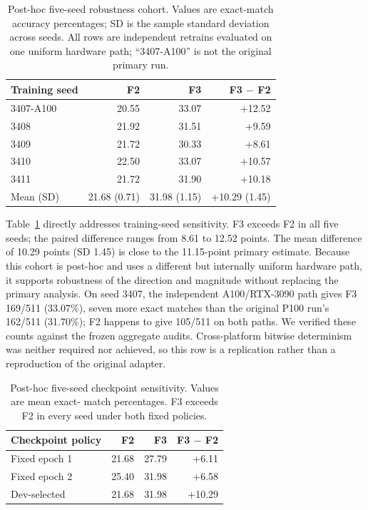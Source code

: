 \documentclass[11pt,a4paper]{article}
\begin{document}
\begin{table}[t]
\centering
\scriptsize
\setlength{\tabcolsep}{3pt}
\begin{tabular}{lrrr}
\toprule
Training seed & F2 & F3 & F3 $-$ F2 \\
\midrule
3407-A100 & 20.55 & 33.07 & +12.52 \\
3408 & 21.92 & 31.51 & +9.59 \\
3409 & 21.72 & 30.33 & +8.61 \\
3410 & 22.50 & 33.07 & +10.57 \\
3411 & 21.72 & 31.90 & +10.18 \\
\midrule
Mean (SD) & 21.68 (0.71) & 31.98 (1.15) & +10.29 (1.45) \\
\bottomrule
\end{tabular}
\caption{Post-hoc five-seed robustness cohort. Values are exact-match
accuracy percentages; SD is the sample standard deviation across seeds. All
rows are independent retrains evaluated on one uniform hardware path;
``3407-A100'' is not the original primary run.}
\label{tab:multiseed}
\end{table}

Table~\ref{tab:multiseed} directly addresses training-seed sensitivity.  F3
exceeds F2 in all five seeds; the paired difference ranges from 8.61 to 12.52
points.  The mean difference of 10.29 points (SD 1.45) is close to the
11.15-point primary estimate.  Because this cohort is post-hoc and uses a
different but internally uniform hardware path, it supports robustness of the
direction and magnitude without replacing the primary analysis.  On seed
3407, the independent A100/RTX-3090 path gives F3 169/511 (33.07\%), seven
more exact matches than the original P100 run's 162/511 (31.70\%); F2 happens
to give 105/511 on both paths.  We verified these counts against the frozen
aggregate audits.  Cross-platform bitwise determinism was neither required nor
achieved, so this row is a replication rather than a reproduction of the
original adapter.

\begin{table}[t]
\centering
\small
\begin{tabular}{lrrr}
\toprule
Checkpoint policy & F2 & F3 & F3 $-$ F2 \\
\midrule
Fixed epoch 1 & 21.68 & 27.79 & +6.11 \\
Fixed epoch 2 & 25.40 & 31.98 & +6.58 \\
Dev-selected & 21.68 & 31.98 & +10.29 \\
\bottomrule
\end{tabular}
\caption{Post-hoc five-seed checkpoint sensitivity. Values are mean exact-
match percentages. F3 exceeds F2 in every seed under both fixed policies.}
\label{tab:checkpoints}
\end{table}
\end{document}
